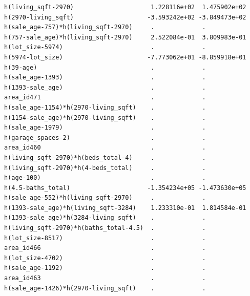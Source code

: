\documentclass[
]{article}
\begin{document}
\begin{verbatim}
h(living_sqft-2970)                     1.228116e+02  1.475902e+02
h(2970-living_sqft)                    -3.593242e+02 -3.849473e+02
h(sale_age-757)*h(living_sqft-2970)     .             .           
h(757-sale_age)*h(living_sqft-2970)     2.522084e-01  3.809983e-01
h(lot_size-5974)                        .             .           
h(5974-lot_size)                       -7.773062e+01 -8.859918e+01
h(39-age)                               .             .           
h(sale_age-1393)                        .             .           
h(1393-sale_age)                        .             .           
area_id471                              .             .           
h(sale_age-1154)*h(2970-living_sqft)    .             .           
h(1154-sale_age)*h(2970-living_sqft)    .             .           
h(sale_age-1979)                        .             .           
h(garage_spaces-2)                      .             .           
area_id460                              .             .           
h(living_sqft-2970)*h(beds_total-4)     .             .           
h(living_sqft-2970)*h(4-beds_total)     .             .           
h(age-100)                              .             .           
h(4.5-baths_total)                     -1.354234e+05 -1.473630e+05
h(sale_age-552)*h(living_sqft-2970)     .             .           
h(1393-sale_age)*h(living_sqft-3284)    1.233310e-01  1.814584e-01
h(1393-sale_age)*h(3284-living_sqft)    .             .           
h(living_sqft-2970)*h(baths_total-4.5)  .             .           
h(lot_size-8517)                        .             .           
area_id466                              .             .           
h(lot_size-4702)                        .             .           
h(sale_age-1192)                        .             .           
area_id463                              .             .           
h(sale_age-1426)*h(2970-living_sqft)    .             .           
                                                                  

\end{verbatim}
\end{document}
